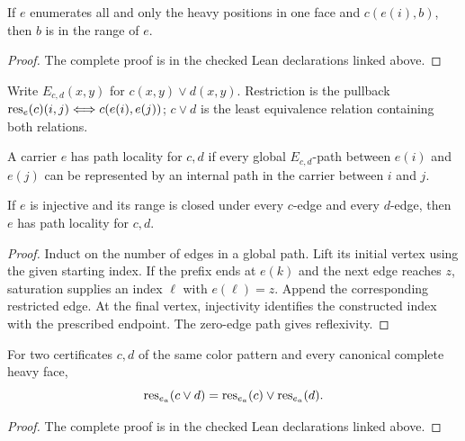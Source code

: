 \begin{corollary}\label{lem:saturation}
If $e$ enumerates all and only the heavy positions in one face and
$c(e(i),b)$, then $b$ is in the range of $e$.
\leanok
{}
\end{corollary}
\begin{proof}\leanok
The complete proof is in the checked Lean declarations linked above.
\end{proof}


Write $E_{c,d}(x,y)$ for $c(x,y)\lor d(x,y)$. Restriction is the pullback
$\operatorname{res}_e(c)(i,j)\Longleftrightarrow c(e(i),e(j))$; $c\vee d$ is the least
equivalence relation containing both relations.
\begin{definition}\label{def:locality}
A carrier $e$ has path locality for $c,d$ if every global $E_{c,d}$-path between
$e(i)$ and $e(j)$ can be represented by an internal path in the carrier
between $i$ and $j$.
\leanok
\end{definition}

\begin{lemma}\label{lem:locality}
If $e$ is injective and its range is closed under every $c$-edge and every
$d$-edge, then $e$ has path locality for $c,d$.
\leanok
{}
\end{lemma}
\begin{proof}
Induct on the number of edges in a global path. Lift its initial vertex using
the given starting index. If the prefix ends at $e(k)$ and the next edge
reaches $z$, saturation supplies an index $\ell$ with $e(\ell)=z$.
Append the corresponding restricted edge. At the final vertex,
injectivity identifies the constructed index with the prescribed endpoint.
The zero-edge path gives reflexivity.
\leanok
\end{proof}

\begin{theorem}\label{thm:join_restriction}
For two certificates $c,d$ of the same color pattern and every canonical
complete heavy face,
\[
 \operatorname{res}_{e_a}(c\vee d)=\operatorname{res}_{e_a}(c)\vee\operatorname{res}_{e_a}(d).
\]
\leanok
{}
\end{theorem}
\begin{proof}\leanok
The complete proof is in the checked Lean declarations linked above.
\end{proof}


